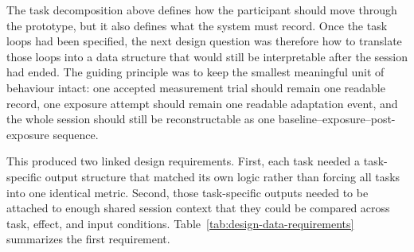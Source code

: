 The task decomposition above defines how the participant should move through the prototype, but it also defines what the system must record. Once the task loops had been specified, the next design question was therefore how to translate those loops into a data structure that would still be interpretable after the session had ended. The guiding principle was to keep the smallest meaningful unit of behaviour intact: one accepted measurement trial should remain one readable record, one exposure attempt should remain one readable adaptation event, and the whole session should still be reconstructable as one baseline--exposure--post-exposure sequence.

This produced two linked design requirements. First, each task needed a task-specific output structure that matched its own logic rather than forcing all tasks into one identical metric. Second, those task-specific outputs needed to be attached to enough shared session context that they could be compared across task, effect, and input conditions. Table~\ref{tab:design-data-requirements} summarizes the first requirement.

